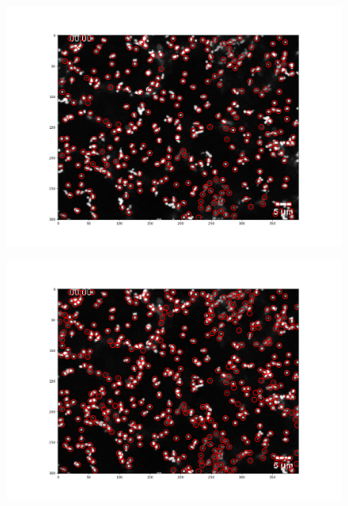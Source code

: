 \begin{enumerate}
\begin{figure}[H]
    \centering
    \begin{minipage}{.5\textwidth}
     	\centering
  	  	\includegraphics[scale=0.3]{Grafiken/trackpyBilder/locate(frames[0], 7).png}
 		\label{fig:test1}
    \end{minipage}
	
	\begin{minipage}{.5\textwidth}
     	\centering
  	  	\includegraphics[scale=0.3]{Grafiken/trackpyBilder/locate(frames[0], 5).png}
 		 \label{fig:test2}
    \end{minipage}
\end{figure}


\end{enumerate}
